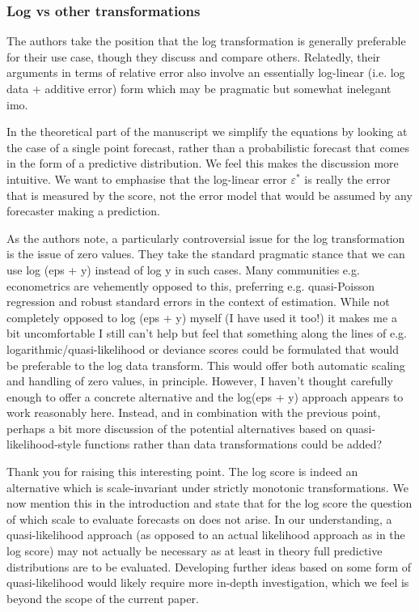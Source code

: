 \documentclass{article}
\newcommand{\black}{\color{black}}
\newcommand{\blue}{\color{blue}}
\newcommand{\notindented}{\setlength{\leftskip}{0cm}}
\begin{document}
\notindented

\blue
\subsubsection{Log vs other transformations}
The authors take the position that the log transformation is generally preferable for their use case, though they discuss and compare others. Relatedly, their arguments in terms of relative error also involve an essentially log-linear (i.e. log data + additive error) form which may be pragmatic but somewhat inelegant imo.

\black
In the theoretical part of the manuscript we simplify the equations by looking at the case of a single point forecast, rather than a probabilistic forecast that comes in the form of a predictive distribution. We feel this makes the discussion more intuitive. We want to emphasise that the log-linear error $\varepsilon^*$ is really the error that is measured by the score, not the error model that would be assumed by any forecaster making a prediction. 


\blue
As the authors note, a particularly controversial issue for the log transformation is the issue of zero values. They take the standard pragmatic stance that we can use log (eps + y) instead of log y in such cases. Many communities e.g. econometrics are vehemently opposed to this, preferring e.g. quasi-Poisson regression and robust standard errors in the context of estimation. While not completely opposed to log (eps + y) myself (I have used it too!) it makes me a bit uncomfortable I still can’t help but feel that something along the lines of e.g. logarithmic/quasi-likelihood or deviance scores could be formulated that would be preferable to the log data transform. This would offer both automatic scaling and handling of zero values, in principle. However, I haven’t thought carefully enough to offer a concrete alternative and the log(eps + y) approach appears to work reasonably here. Instead, and in combination with the previous point, perhaps a bit more discussion of the potential alternatives based on quasi-likelihood-style functions rather than data transformations could be added?

\black
Thank you for raising this interesting point. The log score is indeed an alternative which is scale-invariant under strictly monotonic transformations. We now mention this in the introduction and state that for the log score the question of which scale to evaluate forecasts on does not arise. In our understanding, a quasi-likelihood approach (as opposed to an actual likelihood approach as in the log score) may not actually be necessary as at least in theory full predictive distributions are to be evaluated. Developing further ideas based on some form of quasi-likelihood would likely require more in-depth investigation, which we feel is beyond the scope of the current paper. 
\end{document}
